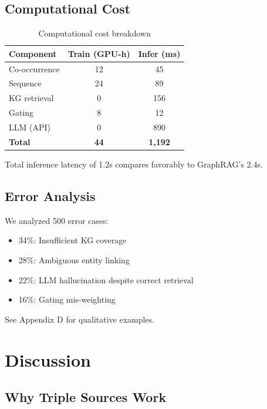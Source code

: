\documentclass[10pt,twocolumn]{article}
\begin{document}
\subsection{Computational Cost}

\begin{table}[t]
\centering
\caption{Computational cost breakdown}
\label{tab:cost}
\small
\begin{tabular}{@{}lcc@{}}
\toprule
\textbf{Component} & \textbf{Train (GPU-h)} & \textbf{Infer (ms)} \\
\midrule
Co-occurrence & 12 & 45 \\
Sequence & 24 & 89 \\
KG retrieval & 0 & 156 \\
Gating & 8 & 12 \\
LLM (API) & 0 & 890 \\
\midrule
\textbf{Total} & \textbf{44} & \textbf{1,192} \\
\bottomrule
\end{tabular}
\end{table}

Total inference latency of 1.2s compares favorably to GraphRAG's 2.4s.

\subsection{Error Analysis}

We analyzed 500 error cases:
\begin{itemize}
    \item 34\%: Insufficient KG coverage
    \item 28\%: Ambiguous entity linking
    \item 22\%: LLM hallucination despite correct retrieval
    \item 16\%: Gating mis-weighting
\end{itemize}

See Appendix D for qualitative examples.

\section{Discussion}

\subsection{Why Triple Sources Work}
\end{document}
